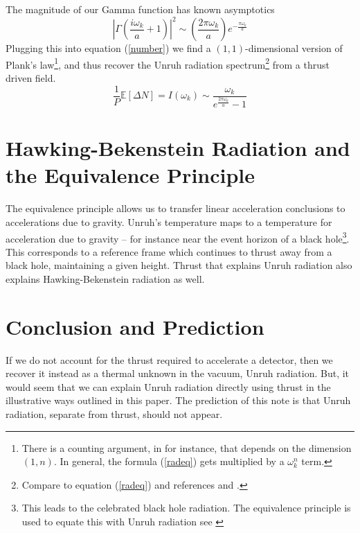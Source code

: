 \documentclass[12pt,a4paper]{article}
\begin{document}
The magnitude of our Gamma function has known asymptotics \cite[Eq.~5.11.9]{NIST:DLMF}
\[
\left|\Gamma\left(\frac{i\omega_k}{a} + 1\right) \right|^2 \sim \left(\frac{2 \pi \omega_k} {a}\right) e^{-\frac{\pi\omega_k}{a}}
\]
Plugging this into equation (\ref{number}) we find a $(1,1)$-dimensional version of Plank's law\footnote{There is a counting argument, in \cite{qspplanck} for instance, that depends on the dimension $(1,n)$.  In general, the formula (\ref{radeq}) gets multiplied by a $\omega_k^n$ term.}, and thus recover the Unruh radiation spectrum\footnote{Compare to equation (\ref{radeq}) and references \cite{unruh} and \cite{Frodden}.} from a thrust driven field.
\[
\frac{1}{P} \mathbb{E}[\Delta N] = I(\omega_k) \sim \frac{\omega_k}{e^{\frac{2 \pi \omega_k}{a}}-1}
\]

\section{Hawking-Bekenstein Radiation and the Equivalence Principle}

The equivalence principle allows us to transfer linear acceleration conclusions to accelerations due to gravity.  Unruh's temperature maps to a temperature for acceleration due to gravity -- for instance near the event horizon of a black hole\footnote{This leads to the celebrated black hole radiation.  The equivalence principle is used to equate this with Unruh radiation see \cite{unruh}}.  This corresponds to a reference frame which continues to thrust away from a black hole, maintaining a given height.  Thrust that explains Unruh radiation also explains Hawking-Bekenstein radiation as well.

\section{Conclusion and Prediction}
If we do not account for the thrust required to accelerate a detector, then we recover it instead as a thermal unknown in the vacuum, Unruh radiation.  But, it would seem that we can explain Unruh radiation directly using thrust in the illustrative ways outlined in this paper.  The prediction of this note is that Unruh radiation, separate from thrust, should not appear.



\end{document}
